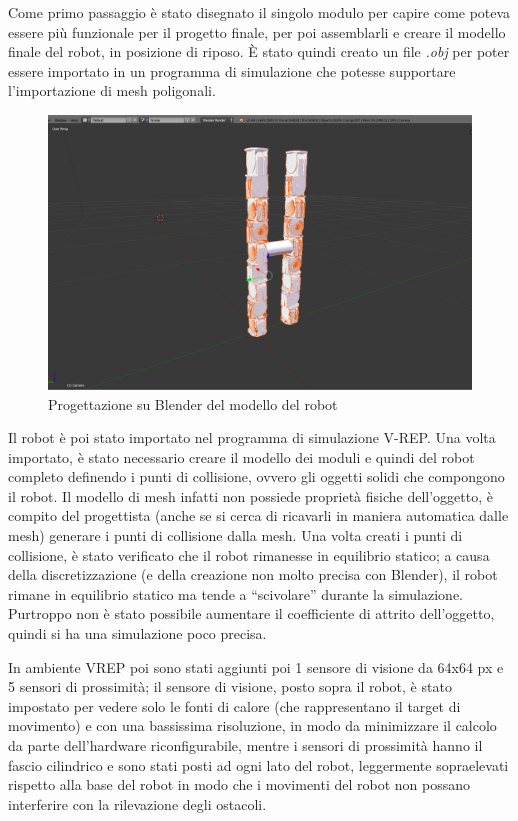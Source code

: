 \documentclass[a4paper,titlepage]{book}
\begin{document}
Come primo passaggio è stato disegnato il singolo modulo per capire come poteva essere più funzionale per il progetto finale, per poi assemblarli e creare il modello finale del robot, in posizione di riposo. È stato quindi creato un file \textit{.obj} per poter essere importato in un programma di simulazione che potesse supportare l'importazione di mesh poligonali.

\begin{figure}[htbp]
\centering
\includegraphics[scale=0.2]{screen_blender.png}
\caption{Progettazione su Blender del modello del robot}\label{fig:9}
\end{figure}

Il robot è poi stato importato nel programma di simulazione V-REP. Una volta importato, è stato necessario creare il modello dei moduli e quindi del robot completo definendo i punti di collisione, ovvero gli oggetti solidi che compongono il robot. Il modello di mesh infatti non possiede proprietà fisiche dell'oggetto, è compito del progettista (anche se si cerca di ricavarli in maniera automatica dalle mesh) generare i punti di collisione dalla mesh.
Una volta creati i punti di collisione, è stato verificato che il robot rimanesse in equilibrio statico; a causa della discretizzazione (e della creazione non molto precisa con Blender), il robot rimane in equilibrio statico ma tende a ``scivolare'' durante la simulazione. Purtroppo non è stato possibile aumentare il coefficiente di attrito dell'oggetto, quindi si ha una simulazione poco precisa.

In ambiente VREP poi sono stati aggiunti poi 1 sensore di visione da 64x64 px e 5 sensori di prossimità; il sensore di visione, posto sopra il robot, è stato impostato per vedere solo le fonti di calore (che rappresentano il target di movimento) e con una bassissima risoluzione, in modo da minimizzare il calcolo da parte dell'hardware riconfigurabile, mentre i sensori di prossimità hanno il fascio cilindrico e sono stati posti ad ogni lato del robot, leggermente sopraelevati rispetto alla base del robot in modo che i movimenti del robot non possano interferire con la rilevazione degli ostacoli.
\end{document}
